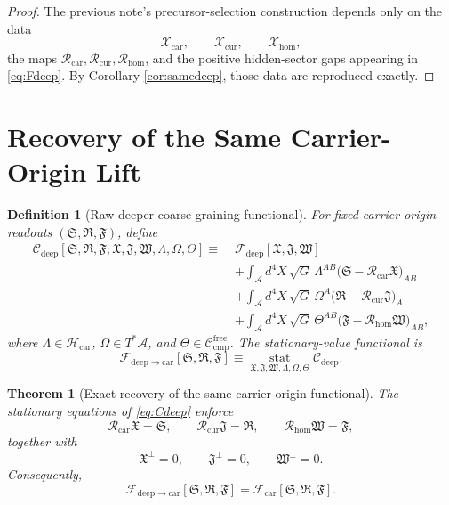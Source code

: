 \documentclass[11pt]{article}
\newcommand{\Sub}{\mathcal A}
\newcommand{\CompFree}{\mathscr C_{\mathrm{cmp}}^{\mathrm{free}}}
\newcommand{\CarrierFunctional}{\mathscr F_{\mathrm{car}}}
\newcommand{\DeepFunctional}{\mathscr F_{\mathrm{deep}}}
\newcommand{\DeepToCar}{\mathscr F_{\mathrm{deep}\to\mathrm{car}}}
\newcommand{\CarrierClass}{\mathscr H_{\mathrm{car}}}
\newcommand{\CarrierSeed}{\mathfrak S}
\newcommand{\RelabelSeed}{\mathfrak R}
\newcommand{\FreeSeed}{\mathfrak F}
\newcommand{\StrainMult}{\Lambda}
\newcommand{\NeutralMult}{\Omega}
\newcommand{\FreeMult}{\Theta}
\newcommand{\DeepTensorClass}{\mathscr X_{\mathrm{car}}}
\newcommand{\DeepRelabelClass}{\mathscr X_{\mathrm{cur}}}
\newcommand{\DeepFreeClass}{\mathscr X_{\mathrm{hom}}}
\newcommand{\DeepTensor}{\mathfrak X}
\newcommand{\DeepRelabel}{\mathfrak J}
\newcommand{\DeepFree}{\mathfrak W}
\newcommand{\CarRead}{\mathcal R_{\mathrm{car}}}
\newcommand{\CurRead}{\mathcal R_{\mathrm{cur}}}
\newcommand{\HomRead}{\mathcal R_{\mathrm{hom}}}
\newtheorem{definition}{Definition}
\newtheorem{theorem}{Theorem}
\begin{document}
\begin{proof}
The previous note's precursor-selection construction depends only on the data
\[
\DeepTensorClass,\qquad
\DeepRelabelClass,\qquad
\DeepFreeClass,
\]
the maps \(\CarRead,\CurRead,\HomRead\), and the positive hidden-sector gaps appearing in \eqref{eq:Fdeep}. By Corollary \ref{cor:samedeep}, those data are reproduced exactly.
\end{proof}

\section{Recovery of the Same Carrier-Origin Lift}

\begin{definition}[Raw deeper coarse-graining functional]
\label{def:deep_cg}
For fixed carrier-origin readouts \((\CarrierSeed,\RelabelSeed,\FreeSeed)\), define
\begin{equation}
\begin{aligned}
\mathscr C_{\mathrm{deep}}
[\CarrierSeed,\RelabelSeed,\FreeSeed;
\DeepTensor,\DeepRelabel,\DeepFree,
\StrainMult,\NeutralMult,\FreeMult]
\equiv\;
&\DeepFunctional[\DeepTensor,\DeepRelabel,\DeepFree]
\\
&+\int_{\Sub} d^4X\,\sqrt{G}\,
\StrainMult^{AB}\bigl(\CarrierSeed-\CarRead\DeepTensor\bigr)_{AB}
\\
&+\int_{\Sub} d^4X\,\sqrt{G}\,
\NeutralMult^A\bigl(\RelabelSeed-\CurRead\DeepRelabel\bigr)_A
\\
&+\int_{\Sub} d^4X\,\sqrt{G}\,
\FreeMult^{AB}\bigl(\FreeSeed-\HomRead\DeepFree\bigr)_{AB},
\end{aligned}
\label{eq:Cdeep}
\end{equation}
where \(\StrainMult\in\CarrierClass\), \(\NeutralMult\in T^*\Sub\), and \(\FreeMult\in\CompFree\). The stationary-value functional is
\begin{equation}
\DeepToCar[\CarrierSeed,\RelabelSeed,\FreeSeed]
\equiv
\operatorname*{stat}_{\DeepTensor,\DeepRelabel,\DeepFree,\StrainMult,\NeutralMult,\FreeMult}
\mathscr C_{\mathrm{deep}}.
\label{eq:Fdeepstat}
\end{equation}
\end{definition}

\begin{theorem}[Exact recovery of the same carrier-origin functional]
\label{thm:recover_car}
The stationary equations of \eqref{eq:Cdeep} enforce
\begin{equation}
\CarRead\DeepTensor=\CarrierSeed,
\qquad
\CurRead\DeepRelabel=\RelabelSeed,
\qquad
\HomRead\DeepFree=\FreeSeed,
\label{eq:deep_constraints_1}
\end{equation}
together with
\begin{equation}
\DeepTensor^{\perp}=0,
\qquad
\DeepRelabel^{\perp}=0,
\qquad
\DeepFree^{\perp}=0.
\label{eq:deep_constraints_2}
\end{equation}
Consequently,
\begin{equation}
\DeepToCar[\CarrierSeed,\RelabelSeed,\FreeSeed]
=
\CarrierFunctional[\CarrierSeed,\RelabelSeed,\FreeSeed].
\label{eq:deep_to_carrier}
\end{equation}
\end{theorem}
\end{document}
